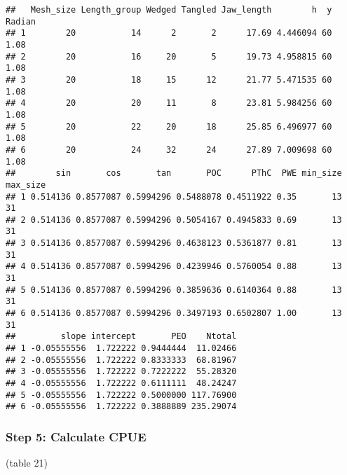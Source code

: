 \documentclass[]{article}
\newenvironment{Shaded}{\begin{snugshade}}{\end{snugshade}}
\newcommand{\KeywordTok}[1]{\textcolor[rgb]{0.13,0.29,0.53}{\textbf{#1}}}
\newcommand{\DataTypeTok}[1]{\textcolor[rgb]{0.13,0.29,0.53}{#1}}
\newcommand{\DecValTok}[1]{\textcolor[rgb]{0.00,0.00,0.81}{#1}}
\newcommand{\StringTok}[1]{\textcolor[rgb]{0.31,0.60,0.02}{#1}}
\newcommand{\CommentTok}[1]{\textcolor[rgb]{0.56,0.35,0.01}{\textit{#1}}}
\newcommand{\OperatorTok}[1]{\textcolor[rgb]{0.81,0.36,0.00}{\textbf{#1}}}
\newcommand{\NormalTok}[1]{#1}
\begin{document}
\begin{verbatim}
##   Mesh_size Length_group Wedged Tangled Jaw_length        h  y Radian
## 1        20           14      2       2      17.69 4.446094 60   1.08
## 2        20           16     20       5      19.73 4.958815 60   1.08
## 3        20           18     15      12      21.77 5.471535 60   1.08
## 4        20           20     11       8      23.81 5.984256 60   1.08
## 5        20           22     20      18      25.85 6.496977 60   1.08
## 6        20           24     32      24      27.89 7.009698 60   1.08
##        sin       cos       tan       POC      PThC  PWE min_size max_size
## 1 0.514136 0.8577087 0.5994296 0.5488078 0.4511922 0.35       13       31
## 2 0.514136 0.8577087 0.5994296 0.5054167 0.4945833 0.69       13       31
## 3 0.514136 0.8577087 0.5994296 0.4638123 0.5361877 0.81       13       31
## 4 0.514136 0.8577087 0.5994296 0.4239946 0.5760054 0.88       13       31
## 5 0.514136 0.8577087 0.5994296 0.3859636 0.6140364 0.88       13       31
## 6 0.514136 0.8577087 0.5994296 0.3497193 0.6502807 1.00       13       31
##         slope intercept       PEO    Ntotal
## 1 -0.05555556  1.722222 0.9444444  11.02466
## 2 -0.05555556  1.722222 0.8333333  68.81967
## 3 -0.05555556  1.722222 0.7222222  55.28320
## 4 -0.05555556  1.722222 0.6111111  48.24247
## 5 -0.05555556  1.722222 0.5000000 117.76900
## 6 -0.05555556  1.722222 0.3888889 235.29074
\end{verbatim}

\subsubsection{Step 5: Calculate CPUE}\label{step-5-calculate-cpue}

(table 21)

\begin{Shaded}
\end{Shaded}
\end{document}
